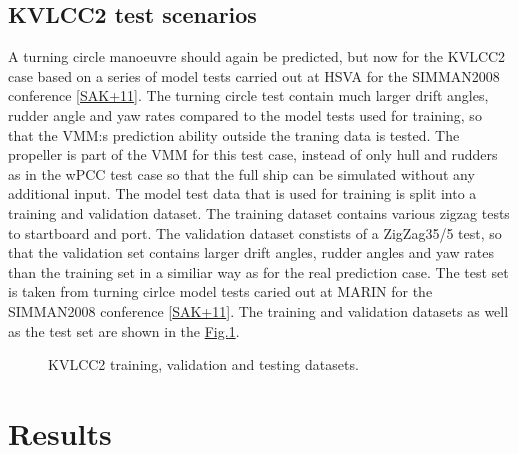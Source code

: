 \documentclass[review]{elsarticle}
\begin{document}
\subsection{KVLCC2 test scenarios}
\label{\detokenize{05.01_case_studies:kvlcc2-test-scenarios}}
\sphinxAtStartPar
A turning circle manoeuvre should again be predicted, but now for the KVLCC2 case based on a series of model tests carried out at HSVA for the SIMMAN2008 conference {[}\hyperlink{cite.bibligraphy:id79}{SAK+11}{]}. The turning circle test contain much larger drift angles, rudder angle and yaw rates compared to the model tests used for training, so that
the VMM:s prediction ability outside the traning data is tested.
The propeller is part of the VMM for this test case, instead of only hull and rudders as in the wPCC test case so that the full ship can be simulated without any additional input.
The model test data that is used for training is split into a training and validation dataset. The training
dataset contains various zigzag tests to startboard and port. The validation dataset constists of a ZigZag35/5
test, so that the validation set contains larger drift angles, rudder angles and yaw rates than the training set
in a similiar way as for the real prediction case.
The test set is taken from turning cirlce model tests caried out at MARIN for the SIMMAN2008 conference
{[}\hyperlink{cite.bibligraphy:id79}{SAK+11}{]}. The training and validation datasets as well as the test set are shown in the \hyperref[\detokenize{05.01_case_studies:fig-kvlcc2-traintest}]{Fig.\@ \ref{\detokenize{05.01_case_studies:fig-kvlcc2-traintest}}}.

\begin{figure}[H]
\centering
\capstart

\noindent{}
\caption{KVLCC2 training, validation and testing datasets.}\label{\detokenize{05.01_case_studies:fig-kvlcc2-traintest}}\end{figure}


\section{Results}
\label{\detokenize{06.01_results:results}}\label{\detokenize{06.01_results:id1}}\label{\detokenize{06.01_results::doc}}
\end{document}
